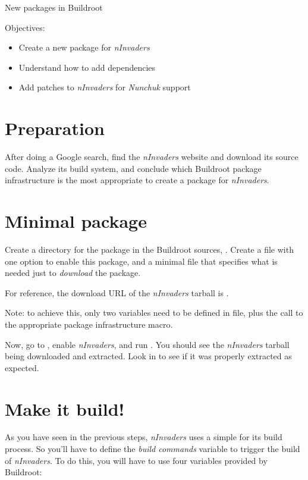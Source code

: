 \subchapter
{New packages in Buildroot}
{Objectives:
  \begin{itemize}
  \item Create a new package for {\em nInvaders}
  \item Understand how to add dependencies
  \item Add patches to {\em nInvaders} for {\em Nunchuk} support
  \end{itemize}
}

\section{Preparation}

After doing a Google search, find the {\em nInvaders} website and
download its source code. Analyze its build system, and conclude which
Buildroot package infrastructure is the most appropriate to create a
package for {\em nInvaders}.

\section{Minimal package}

Create a directory for the package in the Buildroot sources,
. Create a  file with one
option to enable this package, and a minimal  file
that specifies what is needed just to {\em download} the package.

For reference, the download URL of the {\em nInvaders} tarball is
.

Note: to achieve this, only two variables need to be defined in
 file, plus the call to the appropriate package
infrastructure macro.

Now, go to , enable {\em nInvaders}, and run
. You should see the {\em nInvaders} tarball being
downloaded and extracted. Look in  to see if it
was properly extracted as expected.

\section{Make it build!}

As you have seen in the previous steps, {\em nInvaders} uses a simple
 for its build process. So you'll have to define the
{\em build commands} variable to trigger the build of {\em
  nInvaders}. To do this, you will have to use four variables provided
by Buildroot:

